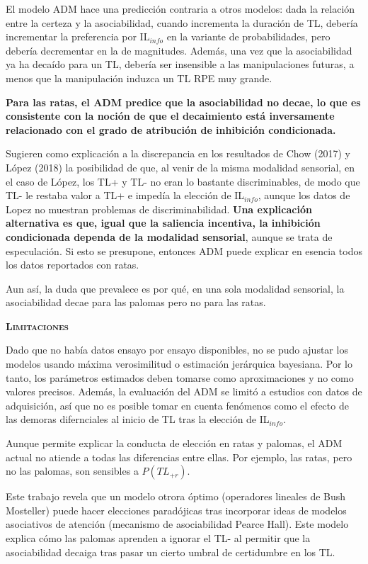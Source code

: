 \documentclass[a4paper,12pt]{article}
\begin{document}
El modelo ADM hace una predicción contraria a otros modelos: dada la relación entre la certeza y la asociabilidad, cuando incrementa la duración de TL, debería incrementar la preferencia por IL$_{info}$ en la variante de probabilidades, pero debería decrementar en la de magnitudes. Además, una vez que la asociabilidad ya ha decaído para un TL, debería ser insensible a las manipulaciones futuras, a menos que la manipulación induzca un TL RPE muy grande.

{\bfseries Para las ratas, el ADM predice que la asociabilidad no decae, lo que es consistente con la noción de que el decaimiento está inversamente relacionado con el grado de atribución de inhibición condicionada.}

Sugieren como explicación a la discrepancia en los resultados de Chow (2017) y López (2018) la posibilidad de que, al venir de la misma modalidad sensorial, en el caso de López, los TL+ y TL- no eran lo bastante discriminables, de modo que TL- le restaba valor a TL+ e impedía la elección de IL$_{info}$, aunque los datos de Lopez no muestran problemas de discriminabilidad. {\bfseries Una explicación alternativa es que, igual que la saliencia incentiva, la inhibición condicionada dependa de la modalidad sensorial}, aunque se trata de especulación. Si esto se presupone, entonces ADM puede explicar en esencia todos los datos reportados con ratas.

Aun así, la duda que prevalece es por qué, en una sola modalidad sensorial, la asociabilidad decae para las palomas pero no para las ratas.

{\scshape\bfseries Limitaciones}

Dado que no había datos ensayo por ensayo disponibles, no se pudo ajustar los modelos usando máxima verosimilitud o estimación jerárquica bayesiana. Por lo tanto, los parámetros estimados deben tomarse como aproximaciones y no como valores precisos. Además, la evaluación del ADM se limitó a estudios con datos de adquisición, así que no es posible tomar en cuenta fenómenos como el efecto de las demoras difernciales al inicio de TL tras la elección de IL$_{info}$.

Aunque permite explicar la conducta de elección en ratas y palomas, el ADM actual no atiende a todas las diferencias entre ellas. Por ejemplo, las ratas, pero no las palomas, son sensibles a $P(TL_{+r})$. 

Este trabajo revela que un modelo otrora óptimo (operadores lineales de Bush Mosteller) puede hacer elecciones paradójicas tras incorporar ideas de modelos asociativos de atención (mecanismo de asociabilidad Pearce Hall). Este modelo explica cómo las palomas aprenden a ignorar el TL- al permitir que la asociabilidad decaiga tras pasar un cierto umbral de certidumbre en los TL. 
\end{document}
